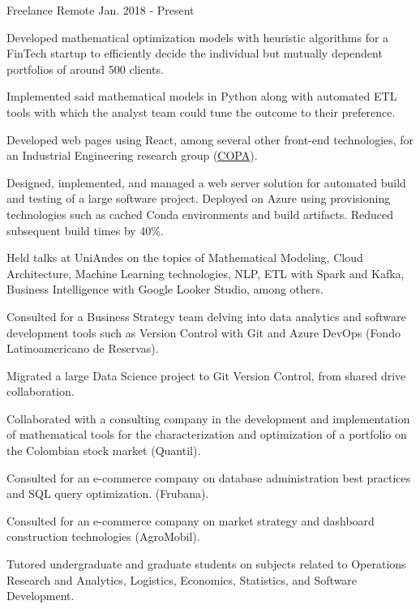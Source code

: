 

\begin{cventries}

	{Freelance} %
	{Remote} %
	{Jan. 2018 {-} Present} %
	{
		\begin{cvitems} %
			\item {Developed mathematical optimization models with heuristic algorithms for a FinTech startup to efficiently decide the individual but mutually dependent portfolios of around 500 clients.}
			\item {Implemented said mathematical models in Python along with automated ETL tools with which the analyst team could tune the outcome to their preference.}
			\item {Developed  web pages using React, among several other front-end technologies, for an Industrial Engineering research group (\href{https://copa.uniandes.edu.co/en/}{COPA}).}
			\item {Designed, implemented, and managed a web server solution for automated build and testing of a large software project. Deployed on Azure using provisioning technologies such as cached Conda environments and build artifacts. Reduced subsequent build times by 40\%.}
			\item {Held talks at UniAndes on the topics of Mathematical Modeling, Cloud Architecture, Machine Learning technologies, NLP, ETL with Spark and Kafka, Business Intelligence with Google Looker Studio, among others.}
			\item {Consulted for a Business Strategy team delving into data analytics and software development tools such as Version Control with Git and Azure DevOps (Fondo Latinoamericano de Reservas).}
			\item {Migrated a large Data Science project to Git Version Control, from shared drive collaboration.}
			\item {Collaborated with a consulting company in the development and implementation of mathematical tools for the characterization and optimization of a portfolio on the Colombian stock market (Quantil).}
			\item {Consulted for an e-commerce company on database administration best practices and SQL query optimization. (Frubana).}
			\item {Consulted for an e-commerce company on market strategy and dashboard construction technologies (AgroMobil).}
			\item {Tutored undergraduate and graduate students on subjects related to Operations Research and Analytics, Logistics, Economics, Statistics, and Software Development.}
		\end{cvitems}
	}


\end{cventries}

